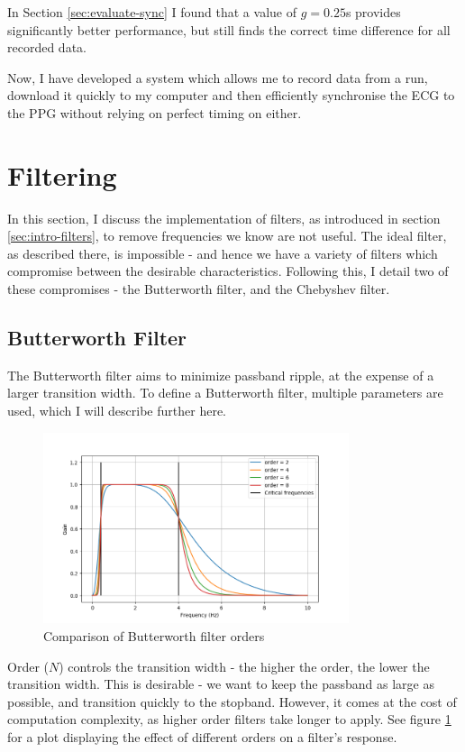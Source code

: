 \documentclass[12pt,a4paper,twoside,openright]{report}
\begin{document}
In Section \ref{sec:evaluate-sync} I found that a value of \(g=0.25\)s
provides significantly better performance, but still finds the correct time
difference for all recorded data.

Now, I have developed a system which allows me to record data from a run,
download it quickly to my computer and then efficiently synchronise the ECG to the PPG
without relying on perfect timing on either.

\section{Filtering}

In this section, I discuss the implementation of filters, as introduced in
section
\ref{sec:intro-filters}, to remove frequencies we know are not useful. 
The ideal filter, as described there, is impossible - and 
hence we have a
variety of filters which compromise between the desirable characteristics.
Following this, I detail two of these compromises - the Butterworth filter,
and the Chebyshev filter.


\subsection{Butterworth Filter}

The Butterworth filter aims to minimize passband ripple, at the expense of a
larger transition width. To define a Butterworth filter, multiple parameters
are used, which I will describe further here.

\begin{figure}[h]
	\centerline{\includegraphics[width=0.8\textwidth]{figs/butter-order-comparison.png}}
\caption{Comparison of Butterworth filter orders}
\label{fig:butterworth-order}
\end{figure}

Order (\(N\)) controls the transition width - the higher the order, the lower
the transition width. This is desirable - we want to keep the passband as
large as possible, and transition quickly to the stopband. However, it comes
at the cost of computation complexity, as higher order filters take longer to
apply. See figure \ref{fig:butterworth-order} for a plot displaying the effect
of different orders on a filter's response.
\end{document}
